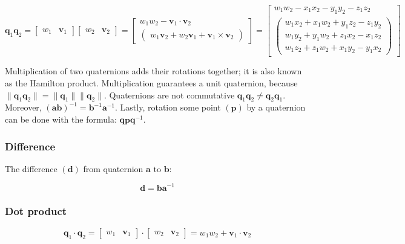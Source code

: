 $$
\textbf{q}_1\textbf{q}_2=\begin{bmatrix}
	w_1 & \textbf{v}_1
\end{bmatrix}\begin{bmatrix}
	w_2 & \textbf{v}_2
\end{bmatrix}=\begin{bmatrix}
	w_1w_2-\textbf{v}_1\cdot\textbf{v}_2 \\
	\begin{pmatrix}
		w_1\textbf{v}_2 + w_2\textbf{v}_1 + \textbf{v}_1\times\textbf{v}_2
	\end{pmatrix}
\end{bmatrix}
=\begin{bmatrix}
	w_1w_2-x_1x_2-y_1y_2-z_1z_2 \\
	\begin{pmatrix}
		w_1x_2 + x_1w_2 + y_1z_2 - z_1y_2 \\
		w_1y_2 + y_1w_2 + z_1x_2 - x_1z_2 \\
		w_1z_2 + z_1w_2 + x_1y_2 - y_1x_2
	\end{pmatrix}
\end{bmatrix}
$$

Multiplication of two quaternions adds their rotations together; it is also known as the Hamilton product. Multiplication guarantees a unit quaternion, because $\|\textbf{q}_1\textbf{q}_2\|=\|\textbf{q}_1\|\|\textbf{q}_2\|$. Quaternions are not commutative $\textbf{q}_1\textbf{q}_2\neq\textbf{q}_2\textbf{q}_1$. Moreover, $(\textbf{ab})^{-1}=\textbf{b}^{-1}\textbf{a}^{-1}$. Lastly, rotation some point $(\textbf{p})$ by a quaternion can be done with the formula: $\textbf{qp}\textbf{q}^{-1}$.

\subsubsection{Difference}

The difference $(\textbf{d})$ from quaternion $\textbf{a}$ to $\textbf{b}$:

$$
\textbf{d}=\textbf{b}\textbf{a}^{-1}
$$

\subsubsection{Dot product}

$$
\textbf{q}_1\cdot\textbf{q}_2=\begin{bmatrix}
	w_1 & \textbf{v}_1
\end{bmatrix}\cdot\begin{bmatrix}
	w_2 & \textbf{v}_2
\end{bmatrix}=
w_1w_2+\textbf{v}_1\cdot\textbf{v}_2
$$

